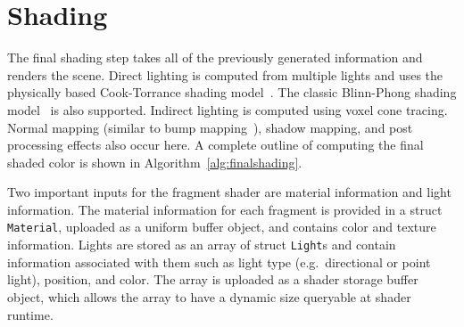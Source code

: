 \section{Shading}
The final shading step takes all of the previously generated information and renders the scene. Direct lighting is computed from multiple lights and uses the physically based Cook-Torrance shading model~\cite{Cook:1982:RMC:357290.357293}. The classic Blinn-Phong shading model~\cite{Phong:1975:ICG:360825.360839} is also supported. Indirect lighting is computed using voxel cone tracing. Normal mapping (similar to bump mapping~\cite{Blinn:1978:SWS:965139.507101}), shadow mapping, and post processing effects also occur here. A complete outline of computing the final shaded color is shown in Algorithm~\ref{alg:finalshading}.


Two important inputs for the fragment shader are material information and light information. The material information for each fragment is provided in a struct \texttt{Material}, uploaded as a uniform buffer object, and contains color and texture information. Lights are stored as an array of struct \texttt{Light}s and contain information associated with them such as light type (e.g.\ directional or point light), position, and color. The array is uploaded as a shader storage buffer object, which allows the array to have a dynamic size queryable at shader runtime.

